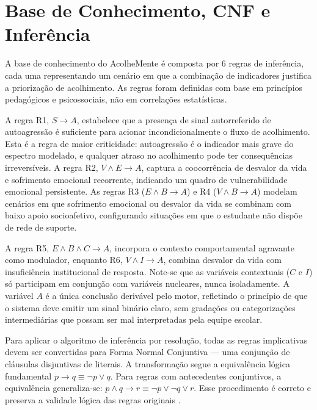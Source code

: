 \documentclass[
    12pt,
    openright,
    oneside,
    a4paper,
    english,
    brazil
]{abntex2}
\begin{document}


\chapter{Base de Conhecimento, CNF e Infer\^encia}

A base de conhecimento do AcolheMente \'e composta por 6 regras de infer\^encia, cada uma representando um cen\'ario em que a combina\c{c}\~ao de indicadores justifica a prioriza\c{c}\~ao de acolhimento. As regras foram definidas com base em princ\'ipios pedag\'ogicos e psicossociais, n\~ao em correla\c{c}\~oes estat\'isticas.

A regra R1, $S \rightarrow A$, estabelece que a presen\c{c}a de sinal autorreferido de autoagress\~ao \'e suficiente para acionar incondicionalmente o fluxo de acolhimento. Esta \'e a regra de maior criticidade: autoagress\~ao \'e o indicador mais grave do espectro modelado, e qualquer atraso no acolhimento pode ter consequ\^encias irrevers\'iveis. A regra R2, $V \land E \rightarrow A$, captura a coocorr\^encia de desvalor da vida e sofrimento emocional recorrente, indicando um quadro de vulnerabilidade emocional persistente. As regras R3 ($E \land B \rightarrow A$) e R4 ($V \land B \rightarrow A$) modelam cen\'arios em que sofrimento emocional ou desvalor da vida se combinam com baixo apoio socioafetivo, configurando situa\c{c}\~oes em que o estudante n\~ao disp\~oe de rede de suporte.

A regra R5, $E \land B \land C \rightarrow A$, incorpora o contexto comportamental agravante como modulador, enquanto R6, $V \land I \rightarrow A$, combina desvalor da vida com insufici\^encia institucional de resposta. Note-se que as vari\'aveis contextuais ($C$ e $I$) s\'o participam em conjun\c{c}\~ao com vari\'aveis nucleares, nunca isoladamente. A vari\'avel $A$ \'e a \'unica conclus\~ao deriv\'avel pelo motor, refletindo o princ\'ipio de que o sistema deve emitir um sinal bin\'ario claro, sem grada\c{c}\~oes ou categoriza\c{c}\~oes intermedi\'arias que possam ser mal interpretadas pela equipe escolar.



Para aplicar o algoritmo de infer\^encia por resolu\c{c}\~ao, todas as regras implicativas devem ser convertidas para Forma Normal Conjuntiva --- uma conjun\c{c}\~ao de cl\'ausulas disjuntivas de literais. A transforma\c{c}\~ao segue a equival\^encia l\'ogica fundamental $p \rightarrow q \equiv \neg p \lor q$. Para regras com antecedentes conjuntivos, a equival\^encia generaliza-se: $p \land q \rightarrow r \equiv \neg p \lor \neg q \lor r$. Esse procedimento \'e correto e preserva a validade l\'ogica das regras originais \cite{russell_norvig_2022}.
\end{document}
